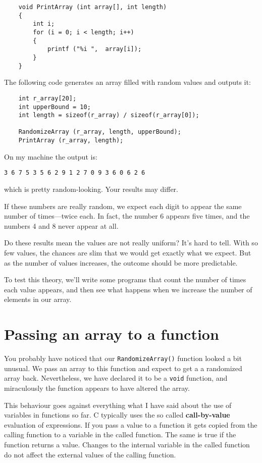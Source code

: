 \begin{verbatim}
    void PrintArray (int array[], int length) 
    {
        int i;
        for (i = 0; i < length; i++) 
        {
            printf ("%i ",  array[i]);
        }
    }
\end{verbatim}
%
The following code generates an array filled with random values and outputs it:

\begin{verbatim}
    int r_array[20];
    int upperBound = 10;
    int length = sizeof(r_array) / sizeof(r_array[0]);
  
    RandomizeArray (r_array, length, upperBound);
    PrintArray (r_array, length);
\end{verbatim}

%
On my machine the output is:

\begin{verbatim}
3 6 7 5 3 5 6 2 9 1 2 7 0 9 3 6 0 6 2 6 
\end{verbatim}
\nopagebreak%
which is pretty random-looking.  Your results may differ.

If these numbers are really random,
we expect each digit to appear the same number of times---twice
each.  In fact, the number 6 appears five times, and the numbers 4
and 8 never appear at all.

Do these results mean the values are not really uniform?  It's
hard to tell.  With so few values, the chances are slim
that we would get exactly what we expect.  But as the number
of values increases, the outcome should be more predictable.

To test this theory, we'll write some programs that count the
number of times each value appears, and then see what happens
when we increase the number of elements in our array.

\section{Passing an array to a function}
\label{Passing an array to a function}
You probably have noticed that our {\tt RandomizeArray()} function 
looked a bit unusual. We pass an array to this function and expect 
to get a a randomized array back. Nevertheless, we have declared it to 
be a {\tt void} function, and miraculously the function appears to have 
altered the array.

This behaviour goes against everything what I have said about the
use of variables in functions so far.
C typically uses the so called {\bf call-by-value} evaluation of
expressions. If you pass a value to a function it gets copied from
the calling function to a variable in the called function. The same
is true if the function returns a value.
Changes to the internal variable in the called function do not affect the external 
values of the calling function.

